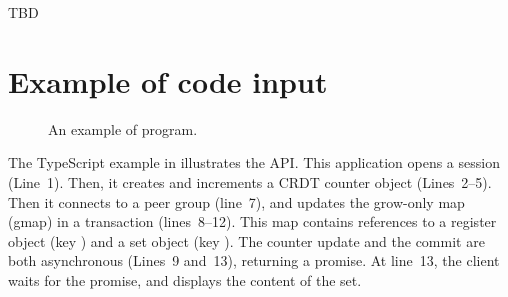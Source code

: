 
TBD

\section{Example of code input}

\begin{figure}[th]
  
  \caption{
    An example of \system{} program.
  }
\end{figure}

The TypeScript example in  illustrates the API.
This application opens a session (Line~1).
Then, it creates and increments a CRDT counter object (Lines~2--5).
Then it connects to a peer group (line~7), and updates the grow-only map
(gmap) \code{{\color{RoyalPurple}{``myMap''}}} in a transaction
(lines~8--12).
This map contains references to a register object (key
\code{{\color{RoyalPurple}{``a''}}}) and a set object (key
\code{{\color{RoyalPurple}{``e''}}}).
The counter update and the commit are both asynchronous 
(Lines~9 and~13), returning a promise.
At line~13, the client waits for the promise, and displays the content
of the set.
